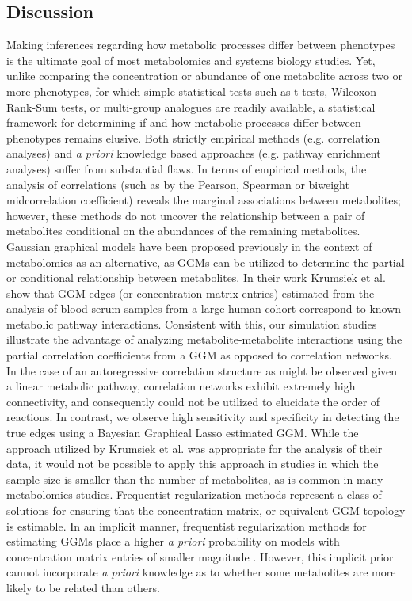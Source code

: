 \begin{DoubleSpace*}
\section{Discussion}
Making inferences regarding how metabolic processes differ between phenotypes is the ultimate goal of most metabolomics and systems biology studies. Yet, unlike comparing the concentration or abundance of one metabolite across two or more phenotypes, for which simple statistical tests such as t-tests, Wilcoxon Rank-Sum tests, or multi-group analogues are readily available, a statistical framework for determining if and how metabolic processes differ between phenotypes remains elusive. Both strictly empirical methods (e.g. correlation analyses) and \emph{a priori} knowledge based approaches (e.g. pathway enrichment analyses) suffer from substantial flaws. In terms of empirical methods, the analysis of correlations (such as by the Pearson, Spearman or biweight midcorrelation coefficient) reveals the marginal associations between metabolites; however, these methods do not uncover the relationship between a pair of metabolites conditional on the abundances of the remaining metabolites. Gaussian graphical models have been proposed previously in the context of metabolomics \cite{krumsiek2011} as an alternative, as GGMs can be utilized to determine the partial or conditional relationship between metabolites. In their work Krumsiek et al. \cite{krumsiek2011} show that GGM edges (or concentration matrix entries) estimated from the analysis of blood serum samples from a large human cohort correspond to known metabolic pathway interactions. Consistent with this, our simulation studies illustrate the advantage of analyzing metabolite-metabolite interactions using the partial correlation coefficients from a GGM as opposed to correlation networks. In the case of an autoregressive correlation structure as might be observed given a linear metabolic pathway, correlation networks exhibit extremely high connectivity, and consequently could not be utilized to elucidate the order of reactions. In contrast, we observe high sensitivity and specificity in detecting the true edges using a Bayesian Graphical Lasso estimated GGM. While the approach utilized by Krumsiek et al. \cite{krumsiek2011} was appropriate for the analysis of their data, it would not be possible to apply this approach in studies in which the sample size is smaller than the number of metabolites, as is common in many metabolomics studies. Frequentist regularization methods represent a class of solutions for ensuring that the concentration matrix, or equivalent GGM topology is estimable. In an implicit manner, frequentist regularization methods for estimating GGMs place a higher \emph{a priori} probability on models with concentration matrix entries of smaller magnitude \cite{wang2012}. However, this implicit prior cannot incorporate \emph{a priori} knowledge as to whether some metabolites are more likely to be related than others.


\end{DoubleSpace*}
